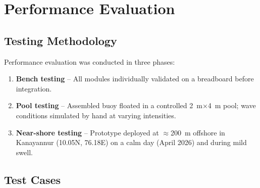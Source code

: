 
\chapter{Performance Evaluation}
\label{chap:evaluation}

\section{Testing Methodology}

Performance evaluation was conducted in three phases:

\begin{enumerate}
  \item \textbf{Bench testing} – All modules individually validated on a breadboard
        before integration.
  \item \textbf{Pool testing} – Assembled buoy floated in a controlled 2~m×4~m pool;
        wave conditions simulated by hand at varying intensities.
  \item \textbf{Near-shore testing} – Prototype deployed at $\approx$200~m offshore
        in Kanayannur (10.05\textdegree{}N, 76.18\textdegree{}E) on a calm day
        (April 2026) and during mild swell.
\end{enumerate}

\section{Test Cases}

